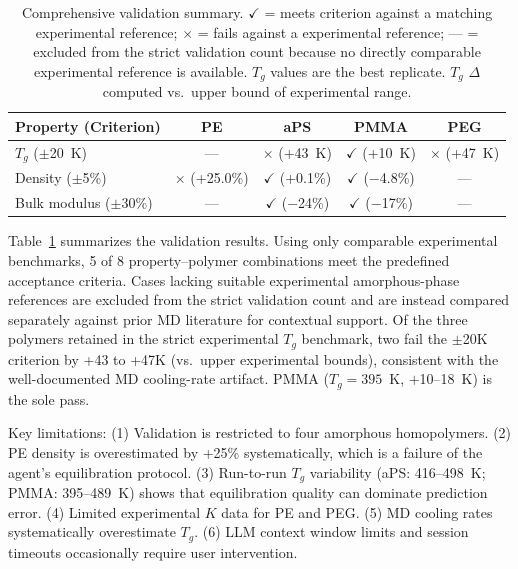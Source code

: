 \documentclass[journal=acsami,manuscript=article]{achemso}
\begin{document}
\begin{table}[ht]
\centering
\caption{Comprehensive validation summary.
$\checkmark$ = meets criterion against a matching experimental reference; $\times$ = fails against a  experimental reference; --- = excluded from the strict validation count because no directly comparable experimental reference is available.
$T_g$ values are the best replicate.
$T_g$ $\Delta$ computed vs.\ upper bound of experimental range.}
\label{tab:validation_summary}
\begin{tabular}{lcccc}
\toprule
\textbf{Property (Criterion)} & \textbf{PE} & \textbf{aPS} & \textbf{PMMA} & \textbf{PEG} \\
\midrule
$T_g$ ($\pm$20~K) & --- & $\times$ (+43~K) & $\checkmark$ (+10~K) & $\times$ (+47~K) \\
Density ($\pm$5\%) & $\times$ (+25.0\%) & $\checkmark$ (+0.1\%) & $\checkmark$ ($-$4.8\%) & --- \\
Bulk modulus ($\pm$30\%) & --- & $\checkmark$ ($-$24\%) & $\checkmark$ ($-$17\%) & --- \\
\bottomrule


\end{tabular}
\end{table}
Table~\ref{tab:validation_summary} summarizes the validation results. Using only comparable experimental benchmarks, 5 of 8 property--polymer combinations meet the predefined acceptance criteria. Cases lacking suitable experimental amorphous-phase references are excluded from the strict validation count and are instead compared separately against prior MD literature for contextual support.
Of the three polymers retained in the strict experimental $T_g$ benchmark, two fail the $\pm$20K criterion by +43 to +47K (vs.\ upper experimental bounds), consistent with the well-documented MD cooling-rate artifact.\cite{soldera2006tg}
PMMA ($T_g = 395$~K, $+$10--18~K) is the sole pass.

Key limitations:
(1) Validation is restricted to four amorphous homopolymers.
(2) PE density is overestimated by +25\% systematically, which is a failure of the agent's equilibration protocol.
(3) Run-to-run $T_g$ variability (aPS: 416--498~K; PMMA: 395--489~K) shows that equilibration quality can dominate prediction error.\cite{larsen2011molecular, suter2025ensemble}
(4) Limited experimental $K$ data for PE and PEG.
(5) MD cooling rates systematically overestimate $T_g$.\cite{soldera2006tg}
(6) LLM context window limits and session timeouts occasionally require user intervention.
\end{document}
